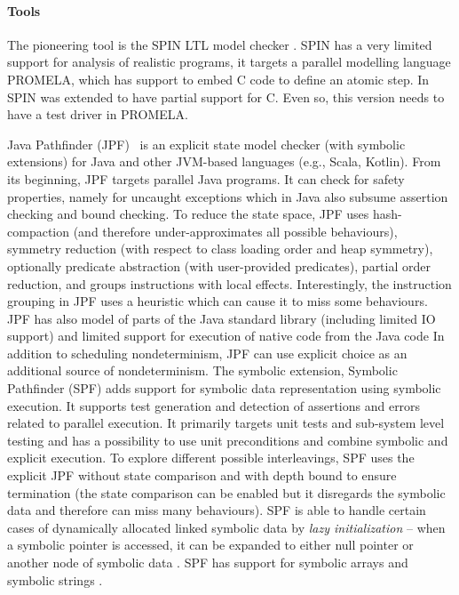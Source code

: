 \paragraph{Tools}

The pioneering tool is the SPIN LTL model checker
.
SPIN has a very limited support for analysis of realistic programs, it targets
a parallel modelling language PROMELA, which has support to embed C code to
define an atomic step.
In~ SPIN was extended to have partial support for C.
Even so, this version needs to have a test driver in PROMELA.

Java Pathfinder (JPF)~ is an explicit state model
checker (with symbolic extensions) for Java and other JVM-based languages (e.g., Scala, Kotlin).
From its beginning, JPF targets parallel Java programs.
It can check for safety properties, namely for uncaught exceptions which in Java also subsume assertion checking and bound checking.
To reduce the state space, JPF uses hash-compaction (and therefore under-approximates all possible behaviours), symmetry reduction (with respect to class loading order and heap symmetry), optionally predicate abstraction (with user-provided predicates), partial order reduction, and groups instructions with local effects.
Interestingly, the instruction grouping in JPF uses a heuristic which can cause it to miss some behaviours.
JPF has also model of parts of the Java standard library (including limited IO
support) and limited support for execution of native code from the Java
code
In addition to scheduling nondeterminism, JPF can use explicit choice as an
additional source of nondeterminism.
The symbolic extension, Symbolic Pathfinder (SPF)  adds
support for symbolic data representation using symbolic execution.
It supports test generation and detection of assertions and errors related to parallel execution.
It primarily targets unit tests and sub-system level testing and has a
possibility to use unit preconditions and combine symbolic and explicit
execution.
To explore different possible interleavings, SPF uses the explicit JPF without
state comparison and with depth bound to ensure termination (the state
comparison can be enabled but it disregards the symbolic data and therefore
can miss many behaviours).
SPF is able to handle certain cases of dynamically allocated
linked symbolic data by \emph{lazy initialization} -- when a symbolic pointer
is accessed, it can be expanded to either null pointer or another node of
symbolic data .
SPF has support for symbolic arrays  and symbolic strings .

